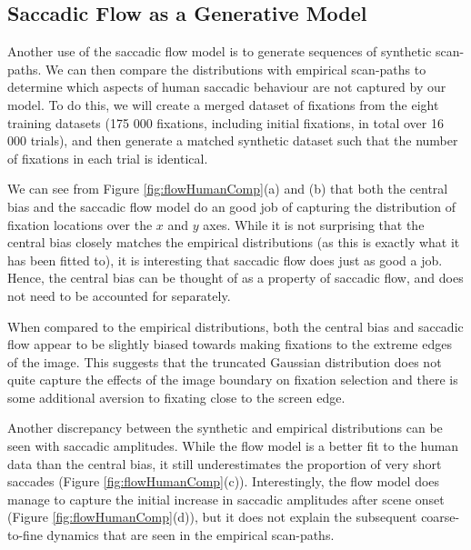 \subsection{Saccadic Flow as a Generative Model}
\label{sec:humanComp}

Another use of the saccadic flow model is to generate sequences of synthetic scan-paths. We can then compare the distributions with empirical scan-paths to determine which aspects of human saccadic behaviour are not captured by our model. To do this, we will create a merged dataset of fixations from the eight training datasets (175 000 fixations, including initial fixations, in total over 16 000 trials), and then generate a matched synthetic dataset such that the number of fixations in each trial is identical. 

We can see from Figure \ref{fig:flowHumanComp}(a) and (b) that both the central bias and the saccadic flow model do an good job of capturing the distribution of fixation locations over the $x$ and $y$ axes. While it is not surprising that the central bias closely matches the empirical distributions (as this is exactly what it has been fitted to), it is interesting that saccadic flow does just as good a job. Hence, the central bias can be thought of as a property of saccadic flow, and does not need to be accounted for separately. 

When compared to the empirical distributions, both the central bias and saccadic flow appear to be slightly biased towards making fixations to the extreme edges of the image. This suggests that the truncated Gaussian distribution does not quite capture the effects of the image boundary on fixation selection and there is some additional aversion to fixating close to the screen edge. 

Another discrepancy between the synthetic and empirical distributions can be seen with saccadic amplitudes. While the flow model is a better fit to the human data than the central bias, it still underestimates the proportion of very short saccades (Figure \ref{fig:flowHumanComp}(c)). Interestingly, the flow model does manage to capture the initial increase in saccadic amplitudes after scene onset (Figure \ref{fig:flowHumanComp}(d)), but it does not explain the subsequent coarse-to-fine dynamics that are seen in the empirical scan-paths. 


